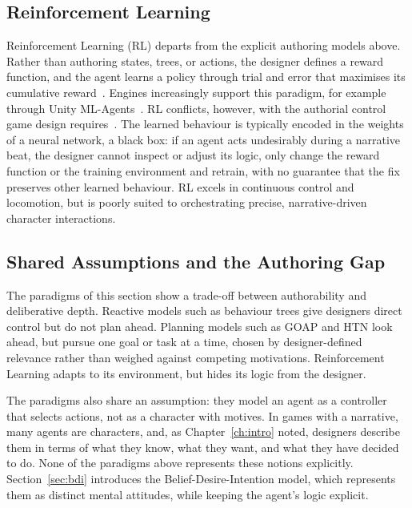 \subsection{Reinforcement Learning}
\label{sec:rl}
 
Reinforcement Learning (RL) departs from the explicit authoring models above. Rather than authoring states, trees, or actions, the designer defines a reward function, and the agent learns a policy through trial and error that maximises its cumulative reward~\cite{Yannakakis2025}. Engines increasingly support this paradigm, for example through Unity ML-Agents~\cite{Juliani2018}. RL conflicts, however, with the authorial control game design requires~\cite{Yannakakis2025}. The learned behaviour is typically encoded in the weights of a neural network, a black box: if an agent acts undesirably during a narrative beat, the designer cannot inspect or adjust its logic, only change the reward function or the training environment and retrain, with no guarantee that the fix preserves other learned behaviour. RL excels in continuous control and locomotion, but is poorly suited to orchestrating precise, narrative-driven character interactions.
 
\subsection{Shared Assumptions and the Authoring Gap}
\label{sec:game-ai-summary}
 
The paradigms of this section show a trade-off between authorability and deliberative depth. Reactive models such as behaviour trees give designers direct control but do not plan ahead. Planning models such as GOAP and HTN look ahead, but pursue one goal or task at a time, chosen by designer-defined relevance rather than weighed against competing motivations. Reinforcement Learning adapts to its environment, but hides its logic from the designer.
 
The paradigms also share an assumption: they model an agent as a controller that selects actions, not as a character with motives. In games with a narrative, many agents are characters, and, as Chapter~\ref{ch:intro} noted, designers describe them in terms of what they know, what they want, and what they have decided to do. None of the paradigms above represents these notions explicitly. Section~\ref{sec:bdi} introduces the Belief-Desire-Intention model, which represents them as distinct mental attitudes, while keeping the agent's logic explicit.

